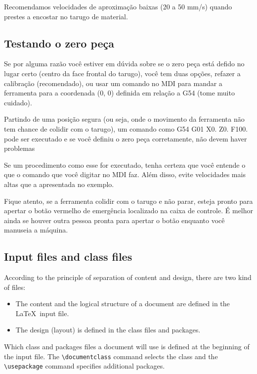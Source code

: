 \documentclass[twoside,a4paper]{refart}
\begin{document}
\attention Recomendamos velocidades de aproximação baixas (20 a 50 mm/s) quando prestes a encostar no tarugo de material.

\subsection{Testando o zero peça}

Se por alguma razão você estiver em dúvida sobre se o zero peça está defido no lugar certo (centro da face frontal do tarugo), você tem duas opções, refazer a calibração (recomendado), ou usar um comando no MDI para mandar a ferramenta para a coordenada (0, 0) definida em relação a G54 (tome muito cuidado).

Partindo de uma posição segura (ou seja, onde o movimento da ferramenta não tem chance de colidir com o tarugo), um comando como G54 G01 X0. Z0. F100. pode ser executado e se você definiu o zero peça corretamente, não devem haver problemas

\attention Se um procedimento como esse for executado, tenha certeza que você entende o que o comando que você digitar no MDI faz. Além disso, evite velocidades mais altas que a apresentada no exemplo.

\attention Fique atento, se a ferramenta colidir com o tarugo e não parar, esteja pronto para apertar o botão vermelho de emergência localizado na caixa de controle. É melhor ainda se houver outra pessoa pronta para apertar o botão enquanto você manuseia a máquina. 

\subsection{Input files and class files}

According to the principle of separation of content and design, 
there are two kind of files:

\begin{itemize}
\item
        The content and the logical structure of a document are defined in 
        the \LaTeX\ input file.
\item
        The design (layout) is defined in the class files and packages.
\end{itemize}
Which class and packages files a document will use is defined at the 
beginning of the input file.  The \verb|\documentclass| command 
selects the class and the \verb+\usepackage+ command specifies 
additional packages.
\end{document}
